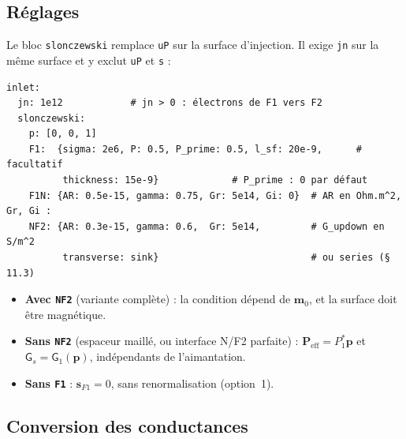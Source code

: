 \documentclass[11pt,a4paper]{article}
\newcommand{\vm}{\bm{m}}
\newcommand{\vp}{\bm{p}}
\newcommand{\vs}{\bm{s}}
\newcommand{\mG}{\mathsf{G}}
\begin{document}
\subsection{Réglages}

Le bloc \texttt{slonczewski} remplace \texttt{uP} sur la surface
d'injection. Il exige \texttt{jn} sur la même surface et y exclut
\texttt{uP} et \texttt{s} :
\begin{verbatim}
inlet:
  jn: 1e12            # jn > 0 : électrons de F1 vers F2
  slonczewski:
    p: [0, 0, 1]
    F1:  {sigma: 2e6, P: 0.5, P_prime: 0.5, l_sf: 20e-9,      # facultatif
          thickness: 15e-9}             # P_prime : 0 par défaut
    F1N: {AR: 0.5e-15, gamma: 0.75, Gr: 5e14, Gi: 0}  # AR en Ohm.m^2, Gr, Gi :
    NF2: {AR: 0.3e-15, gamma: 0.6,  Gr: 5e14,         # G_updown en S/m^2
          transverse: sink}                           # ou series (§ 11.3)
\end{verbatim}
\begin{itemize}
  \item \textbf{Avec \texttt{NF2}} (variante complète) : la condition
    dépend de $\vm_0$, et la surface doit être magnétique.
  \item \textbf{Sans \texttt{NF2}} (espaceur maillé, ou interface N/F2
    parfaite) : $\bm{P}_{\!\mathrm{eff}} = P_1^*\vp$ et
    $\mG_s = \mG_1(\vp)$, indépendants de l'aimantation.
  \item \textbf{Sans \texttt{F1}} : $\vs_{F1}=0$, sans renormalisation
    (option~1).
\end{itemize}

\subsection{Conversion des conductances}
\label{sec:conversion}
\end{document}
